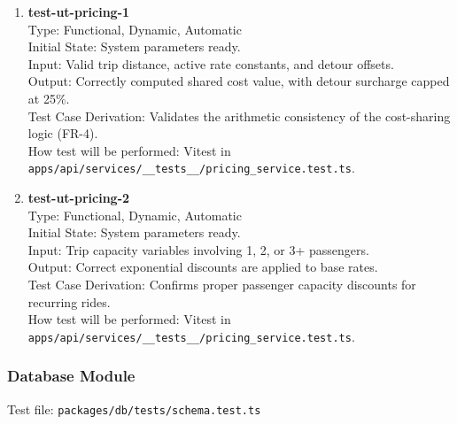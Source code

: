 \documentclass[12pt, titlepage]{article}
\begin{document}
\begin{enumerate}
\item \textbf{test-ut-pricing-1}\\
Type: Functional, Dynamic, Automatic\\
Initial State: System parameters ready.\\
Input: Valid trip distance, active rate constants, and detour offsets.\\
Output: Correctly computed shared cost value, with detour surcharge capped at 25\%.\\
Test Case Derivation: Validates the arithmetic consistency of the cost-sharing logic (FR-4).\\
How test will be performed: Vitest in \texttt{apps/api/services/\_\_tests\_\_/pricing\_service.test.ts}.\\

\item \textbf{test-ut-pricing-2}\\
Type: Functional, Dynamic, Automatic\\
Initial State: System parameters ready.\\
Input: Trip capacity variables involving 1, 2, or 3+ passengers.\\
Output: Correct exponential discounts are applied to base rates.\\
Test Case Derivation: Confirms proper passenger capacity discounts for recurring rides.\\
How test will be performed: Vitest in \texttt{apps/api/services/\_\_tests\_\_/pricing\_service.test.ts}.\\
\end{enumerate}

\subsubsection{Database Module}

Test file: \texttt{packages/db/tests/schema.test.ts}
\end{document}
